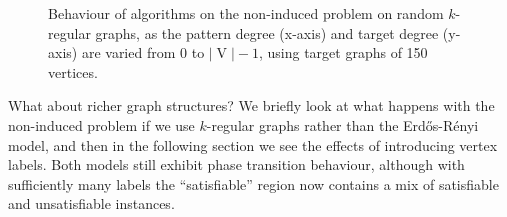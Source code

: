 \documentclass[twoside,11pt]{article}
\begin{document}
\begin{figure}[tb]

    \caption{Behaviour of algorithms on the non-induced problem on random $k$-regular graphs, as the
    pattern degree (x-axis) and target degree (y-axis) are varied from 0 to
    $\left|\operatorname{V}\right| - 1$, using target graphs of 150 vertices.}
    \label{figure:kr}
\end{figure}

What about richer graph structures? We briefly look at what happens with the non-induced problem if
we use $k$-regular graphs rather than the Erd\H{o}s-R\'enyi model, and then in the following section
we see the effects of introducing vertex labels. Both models still exhibit phase transition
behaviour, although with sufficiently many labels the ``satisfiable'' region now contains a mix of
satisfiable and unsatisfiable instances.
\end{document}
